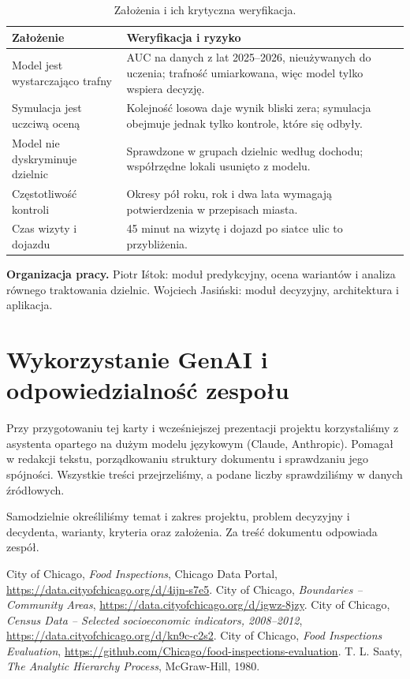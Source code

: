 \documentclass[11pt,a4paper]{article}
\begin{document}
\begin{table}[H]
\centering\small
\caption{Założenia i ich krytyczna weryfikacja.}
\label{tab:assumptions}
\begin{tabularx}{\textwidth}{@{}L{4.6cm}Y@{}}
\toprule
Założenie & Weryfikacja i ryzyko \\
\midrule
Model jest wystarczająco trafny & AUC \AucTestGB{} na danych z lat 2025--2026, nieużywanych do
  uczenia; trafność umiarkowana, więc model tylko wspiera decyzję. \\
Symulacja jest uczciwą oceną & Kolejność losowa daje wynik bliski zera; symulacja obejmuje
  jednak tylko kontrole, które się odbyły. \\
Model nie dyskryminuje dzielnic & Sprawdzone w grupach dzielnic według dochodu; współrzędne
  lokali usunięto z modelu. \\
Częstotliwość kontroli & Okresy pół roku, rok i dwa lata wymagają potwierdzenia w przepisach
  miasta. \\
Czas wizyty i dojazdu & 45 minut na wizytę i dojazd po siatce ulic to przybliżenia. \\
\bottomrule
\end{tabularx}
\end{table}

\textbf{Organizacja pracy.} Piotr Iśtok: moduł predykcyjny, ocena wariantów i analiza
równego traktowania dzielnic. Wojciech Jasiński: moduł decyzyjny, architektura i aplikacja.

\section{Wykorzystanie GenAI i odpowiedzialność zespołu}

Przy przygotowaniu tej karty i wcześniejszej prezentacji projektu korzystaliśmy z asystenta
opartego na dużym modelu językowym (Claude, Anthropic). Pomagał w redakcji tekstu,
porządkowaniu struktury dokumentu i sprawdzaniu jego spójności. Wszystkie treści przejrzeliśmy,
a podane liczby sprawdziliśmy w danych źródłowych.

Samodzielnie określiliśmy temat i zakres projektu, problem decyzyjny i decydenta, warianty,
kryteria oraz założenia. Za treść dokumentu odpowiada zespół.

\begingroup\small\raggedright
\begin{thebibliography}{9}
 City of Chicago, \textit{Food Inspections}, Chicago Data Portal,
  \url{https://data.cityofchicago.org/d/4ijn-s7e5}.
 City of Chicago, \textit{Boundaries -- Community Areas},
  \url{https://data.cityofchicago.org/d/igwz-8jzy}.
 City of Chicago, \textit{Census Data -- Selected socioeconomic indicators,
  2008--2012}, \url{https://data.cityofchicago.org/d/kn9c-c2s2}.
 City of Chicago, \textit{Food Inspections Evaluation},
  \url{https://github.com/Chicago/food-inspections-evaluation}.
 T. L. Saaty, \textit{The Analytic Hierarchy Process}, McGraw-Hill, 1980.
\end{thebibliography}
\endgroup
\end{document}
